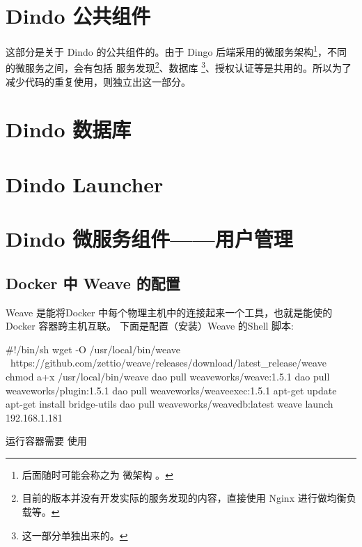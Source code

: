 \documentclass{dingo}
\begin{document}
  \section{Dindo 公共组件}
  这部分是关于 Dindo 的公共组件的。由于 Dingo 后端采用的微服务架构\footnote{后面随时可能会称之为 微架构 。}，不同的微服务之间，会有包括
  服务发现\footnote{目前的版本并没有开发实际的服务发现的内容，直接使用 Nginx 进行做均衡负载等。}、数据库
  \footnote{这一部分单独出来的。}、授权认证等是共用的。所以为了减少代码的重复使用，则独立出这一部分。
  
  \section{Dindo 数据库}
  
  \section{Dindo Launcher}
  
  \section{Dindo 微服务组件——用户管理}
  
  \newpage
  \begin{appendix}
	  	\section{Docker 中 Weave  的配置} %
	  	Weave 是能将Docker 中每个物理主机中的连接起来一个工具，也就是能使的 Docker 容器跨主机互联。
	  	下面是配置（安装）Weave 的Shell 脚本:
	  	\begin{shell}[caption=Weave 安装]
#!/bin/sh
wget -O /usr/local/bin/weave \
https://github.com/zettio/weave/releases/download/latest_release/weave
chmod a+x /usr/local/bin/weave
dao pull weaveworks/weave:1.5.1
dao pull weaveworks/plugin:1.5.1
dao pull weaveworks/weaveexec:1.5.1
apt-get update
apt-get install bridge-utils
dao pull weaveworks/weavedb:latest
weave launch 192.168.1.181
	  	\end{shell}
	  	运行容器需要 使用
  \end{appendix} 
  
\end{document}
